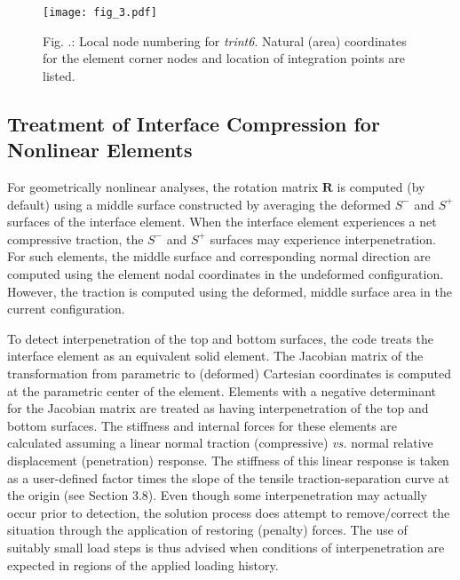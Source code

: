 \documentclass[11pt]{report}
\numberwithin{equation}{section}
\newcommand{\bmf } {\boldsymbol }  %
\newcommand{\vs}{\emph{vs.}\xspace}
\newcommand{\ti}{\emph}
\renewcommand{\thefigure}{\thesection.\arabic{figure}}
\begin{document}
\begin{figure}[htb]
\begin{center}
\texttt{[image: fig\_3.pdf]} 
\caption{{\small Fig. \thefigure: Local node numbering for \ti{trint6}. 
Natural (area) coordinates for the element corner nodes and 
location of integration points are listed.}\label{fig:tri6_def}}
%
\end{center}
\end{figure}

\subsection{Treatment of Interface Compression for Nonlinear Elements}
For geometrically nonlinear analyses, the rotation matrix $\bmf{R}$ 
is computed (by default) using a middle surface constructed
by averaging the deformed $S^-$ and $S^+$ surfaces of the interface element. 
When the interface element experiences a net compressive traction, 
the  $S^-$ and $S^+$ surfaces  may experience interpenetration. 
For such elements, the middle surface 
and corresponding normal direction are computed using the 
element nodal coordinates in the undeformed configuration. However, 
the traction is computed using the deformed, middle surface area 
in the current configuration. 

To detect interpenetration of the top and bottom surfaces, the code treats
the interface element as an equivalent solid element. The Jacobian 
matrix of the transformation from parametric to (deformed) 
Cartesian coordinates is computed at the parametric center of the element. 
Elements with a negative determinant for the Jacobian 
matrix are treated as having interpenetration of the top and bottom surfaces. 
The stiffness and internal forces for these elements are 
calculated assuming a linear normal traction 
(compressive) \vs normal relative displacement 
(penetration) response. The stiffness of this linear 
response  is taken 
as a user-defined factor times the slope of the 
tensile traction-separation curve at the origin (see
Section 3.8). Even though some interpenetration may actually occur
prior to detection, the solution process does attempt to remove/correct
the situation through the application of restoring (penalty) forces. The use of
suitably small load steps is thus advised when conditions of interpenetration are
expected in regions of the applied loading history.
\end{document}
